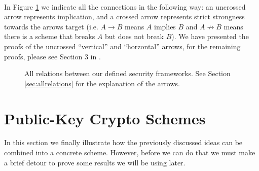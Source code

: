 \documentclass{article}
\theoremstyle{definition}
\begin{document}
\paragraph{} In Figure \ref{fig:secrelations} we indicate all the connections in the following way:
an uncrossed arrow represents implication, and a crossed arrow represents strict
strongness towards the arrows target (i.e. $A \rightarrow B$ means $A$ implies
$B$ and $A \not\rightarrow B$ means there is a scheme that breaks $A$ but does
not break $B$). We have presented the proofs of the uncrossed ``vertical'' and
``horzontal'' arrows, for the remaining proofs, please see Section 3 in \cite{bellaresecurityrelations}.
\begin{figure}
  \centering
  \caption{All relations between our defined security frameworks. See Section
    \ref{sec:allrelations} for the explanation of the arrows.}
  \label{fig:secrelations}
\end{figure}
\section{Public-Key Crypto Schemes}
In this section we finally illustrate how the previously discussed ideas can be
combined into a concrete scheme. However, before we can do that we must make a
brief detour to prove some results we will be using later.
\end{document}

